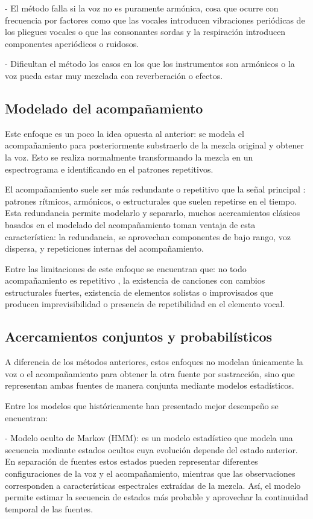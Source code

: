 - El método falla si la voz no es puramente armónica, cosa que ocurre con frecuencia por factores como que las vocales introducen vibraciones periódicas de los pliegues vocales o que las consonantes sordas y la respiración introducen componentes aperiódicos o ruidosos.

- Dificultan el método los casos en los que los instrumentos son armónicos o la voz pueda estar muy mezclada con reverberación o efectos.

\subsection{Modelado del acompañamiento}

Este enfoque es un poco la idea opuesta al anterior: se modela el acompañamiento para posteriormente substraerlo de la mezcla original y obtener la voz. Esto se realiza normalmente transformando la mezcla en un espectrograma e identificando en el patrones repetitivos.

El acompañamiento suele ser más redundante o repetitivo que la señal principal \cite{arreglosGuitarra}: patrones rítmicos, armónicos, o estructurales que suelen repetirse en el tiempo. Esta redundancia permite modelarlo y separarlo, muchos acercamientos clásicos basados en el modelado del acompañamiento toman ventaja de esta característica: la redundancia, se aprovechan componentes de bajo rango, voz dispersa, y repeticiones internas del acompañamiento.

Entre las limitaciones de este enfoque se encuentran que: no todo acompañamiento es repetitivo \cite{acompañamientoNoRepetitivo}, la existencia de canciones con cambios estructurales fuertes, existencia de elementos solistas o improvisados que producen imprevisibilidad o presencia de repetibilidad en el elemento vocal.

\subsection{Acercamientos conjuntos y probabilísticos}

A diferencia de los métodos anteriores, estos enfoques no modelan únicamente la voz o el acompañamiento para obtener la otra fuente por sustracción, sino que representan ambas fuentes de manera conjunta mediante modelos estadísticos.

Entre los modelos que históricamente han presentado mejor desempeño se encuentran:

- Modelo oculto de Markov \cite{markovModels} (HMM): es un modelo estadístico que modela una secuencia mediante estados ocultos cuya evolución depende del estado anterior. En separación de fuentes estos estados pueden representar diferentes configuraciones de la voz y el acompañamiento, mientras que las observaciones corresponden a características espectrales extraídas de la mezcla. Así, el modelo permite estimar la secuencia de estados más probable y aprovechar la continuidad temporal de las fuentes.

